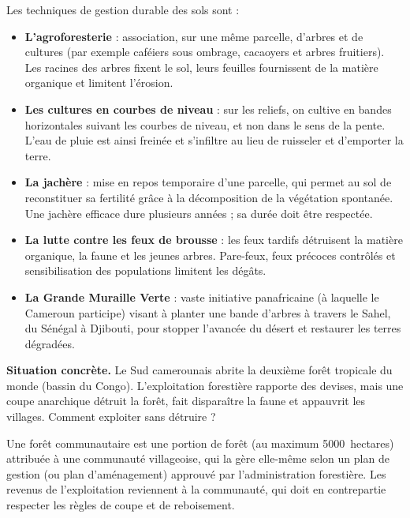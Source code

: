 \documentclass[11pt]{article}
\newcommand{\cle}[1]{{\popxbold\color{popdark}#1}}
\newcounter{popsec}
\newcounter{popsub}
\newcommand{\courssub}[1]{%
  \stepcounter{popsub}%
  \par\vspace{9pt}\noindent{\popxbold\fontsize{11.5}{13}\selectfont\color{popink}{\color{poporange}\thepopsec.\thepopsub}\hspace{6pt}#1}\par\nopagebreak\vspace{4pt}
}
\begin{document}
Les techniques de gestion durable des sols sont :

\begin{itemize}
\item \textbf{L'\cle{agroforesterie}} : association, sur une même parcelle, d'arbres et de cultures (par exemple caféiers sous ombrage, cacaoyers et arbres fruitiers). Les racines des arbres fixent le sol, leurs feuilles fournissent de la matière organique et limitent l'érosion.
\item \textbf{Les cultures en \cle{courbes de niveau}} : sur les reliefs, on cultive en bandes horizontales suivant les courbes de niveau, et non dans le sens de la pente. L'eau de pluie est ainsi freinée et s'infiltre au lieu de ruisseler et d'emporter la terre.
\item \textbf{La \cle{jachère}} : mise en repos temporaire d'une parcelle, qui permet au sol de reconstituer sa fertilité grâce à la décomposition de la végétation spontanée. Une jachère efficace dure plusieurs années ; sa durée doit être respectée.
\item \textbf{La lutte contre les \cle{feux de brousse}} : les feux tardifs détruisent la matière organique, la faune et les jeunes arbres. Pare-feux, feux précoces contrôlés et sensibilisation des populations limitent les dégâts.
\item \textbf{La \cle{Grande Muraille Verte}} : vaste initiative panafricaine (à laquelle le Cameroun participe) visant à planter une bande d'arbres à travers le Sahel, du Sénégal à Djibouti, pour stopper l'avancée du désert et restaurer les terres dégradées.
\end{itemize}

\courssub{La gestion durable des forêts}

\textbf{Situation concrète.} Le Sud camerounais abrite la deuxième forêt tropicale du monde (bassin du Congo). L'exploitation forestière rapporte des devises, mais une coupe anarchique détruit la forêt, fait disparaître la faune et appauvrit les villages. Comment exploiter sans détruire ?

\begin{definition}
Une \cle{forêt communautaire} est une portion de forêt (au maximum \SI{5000}{hectares}) attribuée à une communauté villageoise, qui la gère elle-même selon un \cle{plan de gestion} (ou plan d'aménagement) approuvé par l'administration forestière. Les revenus de l'exploitation reviennent à la communauté, qui doit en contrepartie respecter les règles de coupe et de reboisement.
\end{definition}
\end{document}
